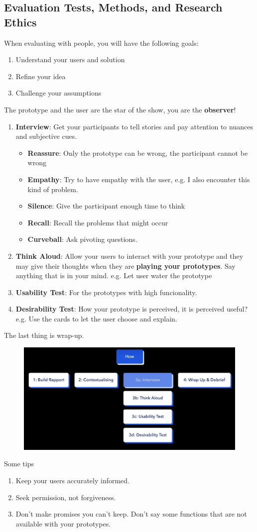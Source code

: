 \documentclass[math,code]{amznotes}
\theoremstyle{remark}
\begin{document}
\subsection{Evaluation Tests, Methods, and Research Ethics}
When evaluating with people, you will have the following goals:
\begin{enumerate}
    \item Understand your users and solution
    \item Refine your idea
    \item Challenge your assumptions
\end{enumerate}
The prototype and the user are the star of the show, you are the \textbf{observer}!
\begin{enumerate}
    \item \textbf{Interview}: Get your participants to tell stories and pay attention to nuances and subjective cues.
    \begin{itemize}
        \item \textbf{Reassure}: Only the prototype can be wrong, the participant cannot be wrong
        \item \textbf{Empathy}: Try to have empathy with the user, e.g. I also encounter this kind of problem.
        \item \textbf{Silence}: Give the participant enough time to think
        \item \textbf{Recall}: Recall the problems that might occur
        \item \textbf{Curveball}: Ask pivoting questions.
    \end{itemize}
    \item \textbf{Think Aloud}: Allow your users to interact with your prototype and they may give their thoughts when they are \textbf{playing your prototypes}. Say anything that is in your mind. e.g. Let user water the prototype
    \item \textbf{Usability Test}: For the prototypes with high funcionality.
    \item \textbf{Desirability Test}: How your prototype is perceived, it is perceived useful? e.g. Use the cards to let the user choose and explain.
\end{enumerate}
The last thing is wrap-up.
\begin{figure}[H]
    \centering
    \includegraphics[width=0.5\linewidth]{images/evaluate-steps.png}
\end{figure}
Some tips
\begin{enumerate}
    \item Keep your users accurately informed.
    \item Seek permission, not forgiveness.
    \item Don't make promises you can't keep. Don't say some functions that are not available with your prototypes.
\end{enumerate}
\end{document}
